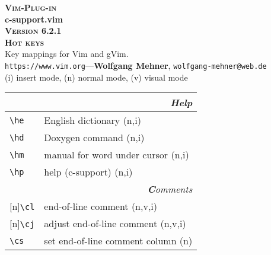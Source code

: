 \documentclass[oneside,11pt,landscape,DIV16]{scrartcl}
\newcommand{\Pluginversion}{6.2.1}
\newcommand{\Rep}{{\tiny{[n]}}}
\begin{document}
%
%
\begin{multicols}{3}
\begin{center}
%
\textbf{\textsc{\small{Vim-Plug-in}}}\\
\textbf{\LARGE{c-support.vim}}\\
\textbf{\textsc{\small{Version \Pluginversion}}}\\
\vspace{1mm}%
\textbf{\textsc{\Huge{Hot keys}}}\\ 
\vspace{1mm}%
Key mappings for Vim and gVim.\\
{\tiny  \texttt{https://www.vim.org}\hspace{1.5mm}---\hspace{1.5mm}\textbf{Wolfgang Mehner},  \texttt{wolfgang-mehner@web.de}}\\
\vspace{1.0mm}
{\normalsize (i)} insert mode, {\normalsize (n)} normal mode, {\normalsize (v)} visual mode\\
\vspace{1.0mm}
%
\begin{tabular}[]{|p{10mm}|p{60mm}|}
\hline 
\multicolumn{2}{|r|}{\textsl{\textbf{H}elp}}\\
\hline \verb'\he'   & English dictionary \hfill (n,i)\\
\hline \verb'\hd'   & Doxygen command \hfill (n,i)\\
\hline \verb'\hm'   & manual for word under cursor  \hfill (n,i)\\
\hline \verb'\hp'   & help (c-support) \hfill (n,i)\\
\hline 
%
\hline
\multicolumn{2}{|r|}{\textsl{\textbf{C}omments}} \\
\hline \Rep\verb'\cl'  & end-of-line comment                     \hfill (n,v,i)\\
\hline \Rep\verb'\cj'  & adjust end-of-line comment              \hfill (n,v,i)\\
\hline     \verb'\cs'  & set end-of-line comment column          \hfill (n)    \\

\end{tabular}
\end{center}
\end{multicols}
\end{document}
